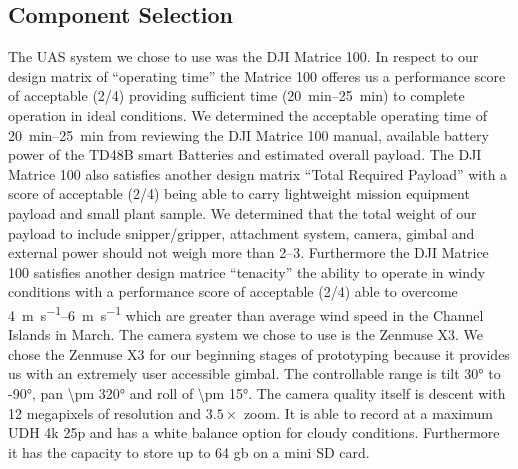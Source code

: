 \documentclass{wrcecapstone}
\begin{document}
\subsection{Component Selection}
The UAS system we chose to use was the DJI Matrice 100. In respect to our design matrix of ``operating time'' the Matrice 100 offeres us a performance score of acceptable (2/4) providing sufficient time (\SIrange{20}{25}{\minute}) to complete operation in ideal conditions.  We determined the acceptable operating time of \SIrange{20}{25}{\minute} from reviewing the DJI Matrice 100 manual, available battery power of the TD48B smart Batteries and estimated overall payload. The DJI Matrice 100 also satisfies another design matrix ``Total Required Payload'' with a score of acceptable (2/4) being able to carry lightweight mission equipment payload and small plant sample. We determined that the total weight of our payload to include snipper/gripper, attachment system, camera, gimbal and external power should not weigh more than \SIrange{2}{3}{\pound}. Furthermore the DJI Matrice 100 satisfies another design matrice ``tenacity'' the ability to operate in windy conditions with a performance score of acceptable (2/4) able to overcome \SIrange{4}{6}{\meter\per\second} which are greater than average wind speed in the Channel Islands in March.  The camera system we chose to use is the Zenmuse X3. We chose the Zenmuse X3 for our beginning stages of prototyping because it provides us with an extremely user accessible gimbal. The controllable range is tilt \ang{+30} to \ang{-90}, pan \ang{\pm 320} and roll of \ang{\pm 15}. The camera quality itself is descent with 12 megapixels of resolution and $\num{3.5}\times$ zoom. It is able to record at a maximum UDH 4k 25p and has a white balance option for cloudy conditions. Furthermore it has the capacity to store up to 64 gb on a mini SD card. 
        
\end{document}
